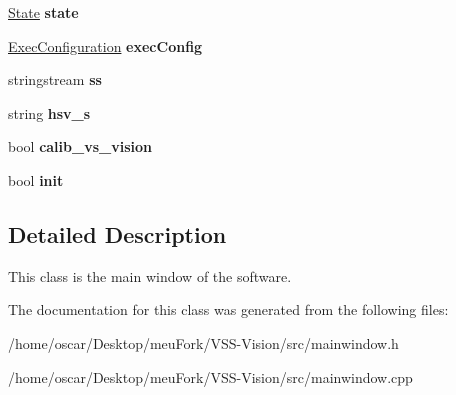 \begin{DoxyCompactItemize}
\item 
\hypertarget{classMainWindow_a5eee26949e66f69193d9858771c482fc}{\hyperlink{structcommon_1_1State}{State} {\bfseries state}}\label{classMainWindow_a5eee26949e66f69193d9858771c482fc}

\item 
\hypertarget{classMainWindow_aa43de17b014bc536003744e375edbdfa}{\hyperlink{structcommon_1_1ExecConfiguration}{Exec\-Configuration} {\bfseries exec\-Config}}\label{classMainWindow_aa43de17b014bc536003744e375edbdfa}

\item 
\hypertarget{classMainWindow_a54b6cd90f16d24527b304706581914b2}{stringstream {\bfseries ss}}\label{classMainWindow_a54b6cd90f16d24527b304706581914b2}

\item 
\hypertarget{classMainWindow_a37fe4fad93ad48280423790a7a6ec91b}{string {\bfseries hsv\-\_\-s}}\label{classMainWindow_a37fe4fad93ad48280423790a7a6ec91b}

\item 
\hypertarget{classMainWindow_abe010ee26a578d28fdd957bb622ba6e1}{bool {\bfseries calib\-\_\-vs\-\_\-vision}}\label{classMainWindow_abe010ee26a578d28fdd957bb622ba6e1}

\item 
\hypertarget{classMainWindow_a851cc4123139bb6d049f4e1e05e3bcc9}{bool {\bfseries init}}\label{classMainWindow_a851cc4123139bb6d049f4e1e05e3bcc9}

\end{DoxyCompactItemize}


\subsection{Detailed Description}
This class is the main window of the software. 

The documentation for this class was generated from the following files\-:\begin{DoxyCompactItemize}
\item 
/home/oscar/\-Desktop/meu\-Fork/\-V\-S\-S-\/\-Vision/src/mainwindow.\-h\item 
/home/oscar/\-Desktop/meu\-Fork/\-V\-S\-S-\/\-Vision/src/mainwindow.\-cpp\end{DoxyCompactItemize}
